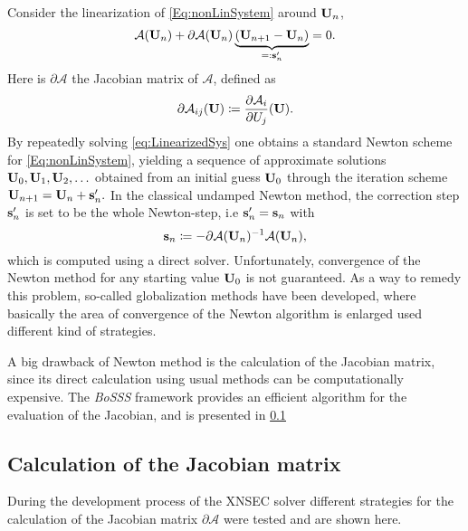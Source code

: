 Consider the linearization of \cref{Eq:nonLinSystem} around $\textbf{U}_n$,
\begin{equation}
	\mathcal{A}(\textbf{U}_{n}) +
	\partial \mathcal{A} (\textbf{U}_n) \underbrace{ ( \textbf{U}_{n+1} -  \textbf{U}_{n} ) }_{=: \textbf{s}'_n }
	= 0.
	\label{eq:LinearizedSys}
\end{equation}
Here is $\partial \mathcal{A}$ the Jacobian matrix of $\mathcal{A}$, defined as
\begin{equation}
	\partial \mathcal{A}_{ij}(\textbf{U}) \coloneqq \frac{\partial \mathcal{A}_i}{\partial U_j}(\textbf{U}).
	\label{Eq:Jacobian}
\end{equation}
By repeatedly solving \cref{eq:LinearizedSys} one obtains a standard Newton scheme for \cref{Eq:nonLinSystem}, yielding a sequence of approximate solutions $\textbf{U}_0, \textbf{U}_1, \textbf{U}_2, \ldots$ obtained from an initial guess $\textbf{U}_0$ through the iteration scheme $ \textbf{U}_{n+1} =\textbf{U}_n + \textbf{s}'_n.$
In the classical undamped Newton method, the correction step $\textbf{s}'_n$ is set to be the whole Newton-step, i.e  $\textbf{s}'_n = \textbf{s}_n$ with
\begin{equation}
	\textbf{s}_n  \coloneqq - \partial \mathcal{A}(\textbf{U}_n)^{-1}\mathcal{A}(\textbf{U}_n),
	\label{eq:NewtonStep}
\end{equation}
which is computed using a direct solver. Unfortunately, convergence of the Newton method for any starting value $\textbf{U}_0$ is not guaranteed. As a way to remedy this problem, so-called globalization methods have been developed, where basically the area of convergence of the Newton algorithm is enlarged used different kind of strategies.  

A big drawback of Newton method is the calculation of the Jacobian matrix, since its direct calculation using usual methods can be computationally expensive. The \textit{BoSSS} framework provides an efficient algorithm for the evaluation of the Jacobian, and is presented in \cref{ssec:EvalJacobian}

\subsection{Calculation of the Jacobian matrix} \label{ssec:EvalJacobian}
During the development process of the XNSEC solver different strategies for the calculation of the Jacobian matrix $\partial \mathcal{A}$ were tested and are shown here. 

